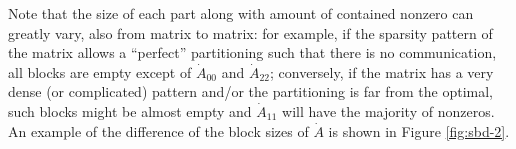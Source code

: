 Note that the size of each part along with amount of contained nonzero can greatly vary, also from matrix to matrix: for example, if the sparsity pattern of the matrix allows a ``perfect'' partitioning such that there is no communication, all blocks are empty except of $\dot{A}_{00}$ and $\dot{A}_{22}$; conversely, if the matrix has a very dense (or complicated) pattern and/or the partitioning is far from the optimal, such blocks might be almost empty and $\dot{A}_{11}$ will have the majority of nonzeros. An example of the difference of the block sizes of $\dot{A}$ is shown in Figure \ref{fig:sbd-2}.

\begin{figure}[h]
	\centering
	 \hspace{1cm}

\end{figure}
